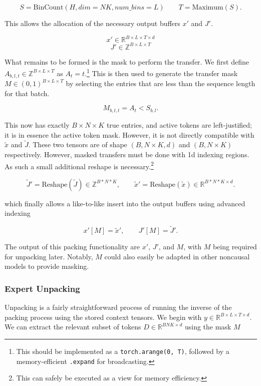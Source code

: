 \documentclass[11pt]{article}
\begin{document}
\[
S = \mathrm{BinCount}(H, dim=NK, num\_bins=L)
\qquad
T = \mathrm{Maximum}(S).
\]

This allows the allocation of the necessary output buffers $x'$ and $J'$.

\[
x' \in \mathbb{R}^{B \times L \times T \times d}
\]
\[
J' \in \mathbb{Z}^{B \times L \times T}
\]

What remains to be formed is the mask to perform the transfer. We first define $A_{b,l,t} \in \mathbb{Z}^{B \times L \times T}$ as $A_t=t$.\footnote{This should be implemented as a \texttt{torch.arange(0, T)}, followed by a memory-efficient \texttt{.expand} for broadcasting.} This is then used to generate the transfer mask $M \in (0,1)^{B \times L \times T}$ by selecting the entries that are less than the sequence length for that batch.

\[
M_{b,l,t} = A_t < S_{b,l}.
\]

This now has exactly $B \times N \times K$ true entries, and active tokens are left-justified; it is in essence the active token mask. However, it is not directly compatible with $\tilde{x}$ and $\tilde{J}$. These two tensors are of shape $(B, N \times K, d)$ and $(B, N \times K)$ respectively. However, masked transfers must be done with 1d indexing regions. As such a small additional reshape is necessary.\footnote{This can safely be executed as a view for memory efficiency.}

\[
\tilde{J}' = \mathrm{Reshape}(\tilde{J}) \in \mathbb{Z}^{B* N * K},
\qquad
\tilde{x}' = \mathrm{Reshape}(\tilde{x}) \in \mathbb{R}^{B * N * K \times d}.
\]

which finally allows a like-to-like insert into the output buffers using advanced indexing

\[
x'[M] = \tilde{x}',
\qquad
J'[M] = \tilde{J}'.
\]

The output of this packing functionality are $x'$, $J'$, and $M$, with $M$ being required for unpacking later. Notably, $M$ could also easily be adapted in other noncausal models to provide masking.



\subsubsection{Expert Unpacking}

Unpacking is a fairly straightforward process of running the inverse of the packing process using the stored context tensors. We begin with $y \in \mathbb{R}^{B \times L \times T \times d}$. We can extract the relevant subset of tokens $D \in \mathbb{R}^{BNK \times d}$ using the mask $M$
\end{document}
